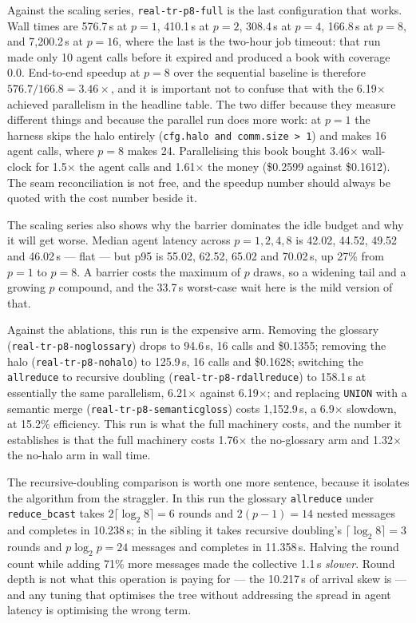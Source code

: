 \documentclass[11pt]{article}
\begin{document}
Against the scaling series, \texttt{real-tr-p8-full} is the last configuration that works.
Wall times are 576.7\,s at $p=1$, 410.1\,s at $p=2$, 308.4\,s at $p=4$, 166.8\,s at $p=8$,
and 7{,}200.2\,s at $p=16$, where the last is the two-hour job timeout: that run made only
10 agent calls before it expired and produced a book with coverage 0.0. End-to-end speedup at $p=8$ over
the sequential baseline is therefore $576.7/166.8 = 3.46\times$, and it is important not to
confuse that with the 6.19$\times$ achieved parallelism in the headline table. The two
differ because they measure different things and because the parallel run does more work:
at $p=1$ the harness skips the halo entirely (\texttt{cfg.halo and comm.size > 1}) and makes
16 agent calls, where $p=8$ makes 24. Parallelising this book bought 3.46$\times$ wall-clock
for 1.5$\times$ the agent calls and 1.61$\times$ the money (\$0.2599 against \$0.1612). The
seam reconciliation is not free, and the speedup number should always be quoted with the
cost number beside it.

The scaling series also shows why the barrier dominates the idle budget and why it will get
worse. Median agent latency across $p=1,2,4,8$ is 42.02, 44.52, 49.52 and 46.02\,s --- flat
--- but p95 is 55.02, 62.52, 65.02 and 70.02\,s, up 27\% from $p=1$ to $p=8$. A barrier
costs the maximum of $p$ draws, so a widening tail and a growing $p$ compound, and the 33.7\,s
worst-case wait here is the mild version of that.

Against the ablations, this run is the expensive arm. Removing the glossary
(\texttt{real-tr-p8-noglossary}) drops to 94.6\,s, 16 calls and \$0.1355; removing the halo
(\texttt{real-tr-p8-nohalo}) to 125.9\,s, 16 calls and \$0.1628; switching the
\texttt{allreduce} to recursive doubling (\texttt{real-tr-p8-rdallreduce}) to 158.1\,s at
essentially the same parallelism, 6.21$\times$ against 6.19$\times$; and replacing \texttt{UNION} with a
semantic merge (\texttt{real-tr-p8-semanticgloss}) costs 1{,}152.9\,s, a 6.9$\times$
slowdown, at 15.2\% efficiency. This run is what the full machinery costs, and the number
it establishes is that the full machinery costs 1.76$\times$ the no-glossary arm and
1.32$\times$ the no-halo arm in wall time.

The recursive-doubling comparison is worth one more sentence, because it isolates the
algorithm from the straggler. In this run the glossary \texttt{allreduce} under
\texttt{reduce\_bcast} takes $2\lceil\log_2 8\rceil = 6$ rounds and $2(p-1)=14$ nested
messages and completes in 10.238\,s; in the sibling it takes recursive doubling's
$\lceil\log_2 8\rceil = 3$ rounds and $p\log_2 p = 24$ messages and completes in
11.358\,s. Halving the round count while adding 71\% more messages made the collective
1.1\,s \emph{slower}. Round depth is not what this operation is paying for --- the
10.217\,s of arrival skew is --- and any tuning that optimises the tree without
addressing the spread in agent latency is optimising the wrong term.
\end{document}
